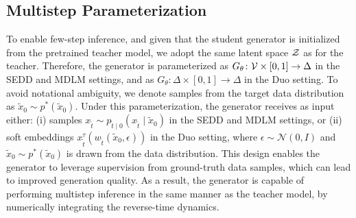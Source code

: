 \subsection{Multistep Parameterization}
To enable few-step inference, and given that the student generator is initialized from the pretrained teacher model, we adopt the same latent space $\mathcal{Z}$ as for the teacher. Therefore, the generator is parameterized as $G_{\theta} \colon \mathcal{V} \times [0, 1] \to \Delta$ in the SEDD and MDLM settings, and as $G_{\theta} \colon \Delta \times [0, 1] \to \Delta$ in the Duo setting. To avoid notational ambiguity, we denote samples from the target data distribution as $\tilde{x}_0 \sim p^*(\tilde{x}_0)$. Under this parameterization, the generator receives as input either: (i) samples $x_{\tilde{t}} \sim p_{\tilde{t} \mid 0}(x_{\tilde{t}} \mid \tilde{x}_0)$ in the SEDD and MDLM settings, or (ii) soft embeddings $x_{\tilde{t}}^{\tau}(w_{\tilde{t}}(\tilde{x}_0, \epsilon))$ in the Duo setting, where $\epsilon \sim \mathcal{N}(0, I)$ and $\tilde{x}_0 \sim p^*(\tilde{x}_0)$ is drawn from the data distribution.
This design enables the generator to leverage supervision from ground-truth data samples, which can lead to improved generation quality. As a result, the generator is capable of performing multistep inference in the same manner as the teacher model, by numerically integrating the reverse-time dynamics.
